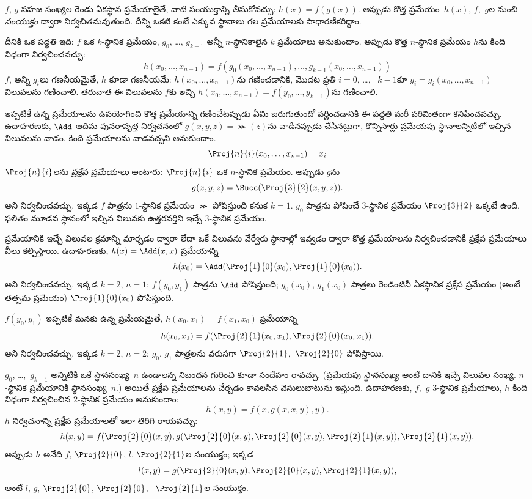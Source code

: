 \documentclass[../../../include/open-logic-section]{subfiles}
\begin{document}

$f$, $g$ సహజ సంఖ్యల రెండు ఏకస్థాన ప్రమేయాలైతే, వాటి
సంయుక్తాన్ని తీసుకోవచ్చు: $h(x)=f(g(x))$. అప్పుడు కొత్త ప్రమేయం~$h(x)$,
$f$,~$g$ల నుంచి \emph{సంయుక్తం} ద్వారా నిర్వచితమవుతుంది. దీన్ని ఒకటి
కంటే ఎక్కువ స్థానాలు గల ప్రమేయాలకు సాధారణీకరిద్దాం.

దీనికి ఒక పద్ధతి ఇది: $f$ ఒక $k$-స్థానిక ప్రమేయం, $g_0$, \dots,
$g_{k-1}$ అన్నీ $n$-స్థానికాలైన $k$ ప్రమేయాలు అనుకుందాం. అప్పుడు
కొత్త $n$-స్థానిక ప్రమేయం $h$ను కింది విధంగా నిర్వచించవచ్చు:
\[
h(x_0, \dots, x_{n-1}) =
f(g_0(x_0, \dots, x_{n-1}), \dots, g_{k-1}(x_0, \dots, x_{n-1}))
\]
$f$, అన్ని $g_i$లు గణనీయమైతే, $h$ కూడా గణనీయమే:
$h(x_0,\dots,x_{n-1})$ను గణించడానికి, మొదట ప్రతి $i=0$, \dots,
~$k-1$కూ $y_i=g_i(x_0,\dots,x_{n-1})$ విలువలను గణించాలి. తరువాత ఈ
విలువలను $f$కు ఇచ్చి $h(x_0,\dots,x_{n-1})=f(y_0,\dots,y_{k-1})$ను
గణించాలి.

ఇప్పటికే ఉన్న ప్రమేయాలను ఉపయోగించి కొత్త ప్రమేయాన్ని గణించేటప్పుడు
ఏమి జరుగుతుందో వర్ణించడానికి ఈ పద్ధతి మరీ పరిమితంగా కనిపించవచ్చు. ఉదాహరణకు, $\Add$ ఆదిమ పునరావృత్త నిర్వచనంలో
$g(x,y,z)=\Succ(z)$ను వాడినప్పుడు చేసినట్లుగా, కొన్నిసార్లు ప్రమేయపు
స్థానాలన్నిటిలో ఇచ్చిన విలువలను వాడం. కింది ప్రమేయాలను వాడవచ్చని అనుకుందాం.
\[
\Proj{n}{i}(x_0, \dots, x_{n-1}) = x_i
\]
$\Proj{n}{i}$లను \emph{ప్రక్షేప ప్రమేయాలు} అంటారు:
$\Proj{n}{i}$ ఒక $n$-స్థానిక ప్రమేయం. అప్పుడు $g$ను
\[
g(x, y, z) = \Succ(\Proj{3}{2}(x, y, z)).
\]
అని నిర్వచించవచ్చు. ఇక్కడ $f$ పాత్రను $1$-స్థానిక ప్రమేయం $\Succ$
పోషిస్తుంది కనుక $k=1$. $g_0$ పాత్రను పోషించే $3$-స్థానిక ప్రమేయం
$\Proj{3}{2}$ ఒక్కటే ఉంది. ఫలితం మూడవ స్థానంలో ఇచ్చిన విలువకు ఉత్తరవర్తిని ఇచ్చే
$3$-స్థానిక ప్రమేయం.

ప్రమేయానికి ఇచ్చే విలువల క్రమాన్ని మార్చడం ద్వారా లేదా ఒకే విలువను
వేర్వేరు స్థానాల్లో ఇవ్వడం ద్వారా
కొత్త ప్రమేయాలను నిర్వచించడానికీ ప్రక్షేప ప్రమేయాలు వీలు కల్పిస్తాయి.
ఉదాహరణకు, $h(x)=\Add(x,x)$ ప్రమేయాన్ని
\[
h(x_0) = \Add(\Proj{1}{0}(x_0),\Proj{1}{0}(x_0)).
\]
అని నిర్వచించవచ్చు. ఇక్కడ $k=2$, $n=1$; $f(y_0,y_1)$ పాత్రను
$\Add$ పోషిస్తుంది; $g_0(x_0)$, $g_1(x_0)$ పాత్రలు రెండింటినీ
ఏకస్థానిక ప్రక్షేప ప్రమేయం (అంటే తత్సమ ప్రమేయం)
$\Proj{1}{0}(x_0)$ పోషిస్తుంది.

$f(y_0,y_1)$ ఇప్పటికే మనకు ఉన్న ప్రమేయమైతే, $h(x_0,x_1)=f(x_1,x_0)$
ప్రమేయాన్ని
\[
h(x_0, x_1) = f(\Proj{2}{1}(x_0, x_1),\Proj{2}{0}(x_0, x_1)).
\]
అని నిర్వచించవచ్చు. ఇక్కడ $k=2$, $n=2$; $g_0$, $g_1$ పాత్రలను
వరుసగా $\Proj{2}{1}$,~$\Proj{2}{0}$ పోషిస్తాయి.

$g_0$, \dots,~$g_{k-1}$ అన్నిటికీ ఒకే స్థానసంఖ్య~$n$ ఉండాలన్న
నిబంధన గురించి కూడా సందేహం రావచ్చు. (ప్రమేయపు \emph{స్థానసంఖ్య} అంటే దానికి ఇచ్చే విలువల సంఖ్య.
$n$-స్థానిక ప్రమేయానికి స్థానసంఖ్య~$n$.) అయితే
ప్రక్షేప ప్రమేయాలను చేర్చడం కావలసిన వెసులుబాటును ఇస్తుంది. ఉదాహరణకు,
$f$,~$g$ $3$-స్థానిక ప్రమేయాలు, $h$ కింది విధంగా నిర్వచించిన
$2$-స్థానిక ప్రమేయం అనుకుందాం:
\[
h(x,y) = f(x,g(x,x,y),y).
\]
$h$ నిర్వచనాన్ని ప్రక్షేప ప్రమేయాలతో ఇలా తిరిగి రాయవచ్చు:
\[
h(x,y) = f(\Proj{2}{0}(x,y), g(\Proj{2}{0}(x,y), \Proj{2}{0}(x,y),
\Proj{2}{1}(x,y)), \Proj{2}{1}(x,y)).
\]
అప్పుడు $h$ అనేది $f$, $\Proj{2}{0}$, $l$, $\Proj{2}{1}$ల
సంయుక్తం; ఇక్కడ
\[
l(x,y) = g(\Proj{2}{0}(x,y),\Proj{2}{0}(x,y),\Proj{2}{1}(x,y)),
\]
అంటే $l$, $g$, $\Proj{2}{0}$, $\Proj{2}{0}$,
~$\Proj{2}{1}$ల సంయుక్తం.
\end{document}
